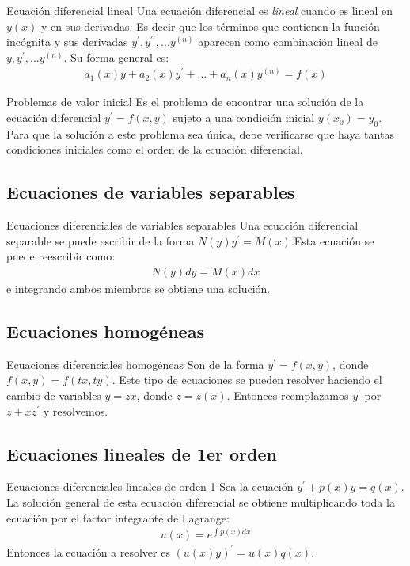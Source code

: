 \documentclass[a4paper, twoside]{article}
\numberwithin{equation}{section}
\numberwithin{figure}{section}
\numberwithin{table}{section}
\begin{document}
\begin{definicion*}{Ecuación diferencial lineal}
	Una ecuación diferencial es \emph{lineal} cuando es lineal en $y(x)$ y en sus derivadas. Es decir que los términos que contienen la función incógnita y sus derivadas $y^\prime,y^{\prime\prime},...y^{(n)}$ aparecen como combinación lineal de $y,y^\prime,...y^{(n)}.$ Su forma general es:
	\begin{align}
		a_1(x)y+a_2(x)y^\prime+\ldots+a_n(x)y^{(n)}=f(x)
	\end{align}
\end{definicion*}

\begin{definicion*}{Problemas de valor inicial}
	Es el problema de encontrar una solución de la ecuación diferencial $y^\prime=f(x,y)$ sujeto a una condición inicial $y(x_0)=y_0$. Para que la solución a este problema sea única, debe verificarse que haya tantas condiciones iniciales como el orden de la ecuación diferencial.
\end{definicion*}

\subsection{Ecuaciones de variables separables}
\begin{definicion*}{Ecuaciones diferenciales de variables separables}
	Una ecuación diferencial separable se puede escribir de la forma $N(y)y^\prime=M(x)$.Esta ecuación se puede reescribir como:
	\begin{align}
		N(y)dy=M(x)dx
	\end{align}
	e integrando ambos miembros se obtiene una solución.
\end{definicion*}

\subsection{Ecuaciones homogéneas}
\begin{definicion*}{Ecuaciones diferenciales homogéneas}
	Son de la forma $y^\prime=f(x,y)$, donde $f(x,y)=f(tx,ty)$. Este tipo de ecuaciones se pueden resolver haciendo el cambio de variables $y=zx$, donde $z=z(x)$. Entonces reemplazamos $y^\prime$ por $z+xz^\prime$ y resolvemos.
\end{definicion*}

\subsection{Ecuaciones lineales de 1er orden}
\begin{definicion*}{Ecuaciones diferenciales lineales de orden 1}
	Sea la ecuación $y^\prime+p(x)y=q(x)$. La solución general de esta ecuación diferencial se obtiene multiplicando toda la ecuación por el factor integrante de Lagrange:
	\begin{align}
		u(x)=e^{\int p(x)dx}
	\end{align}
	Entonces la ecuación a resolver es $(u(x)y)^\prime=u(x)q(x)$.
\end{definicion*}
\end{document}
